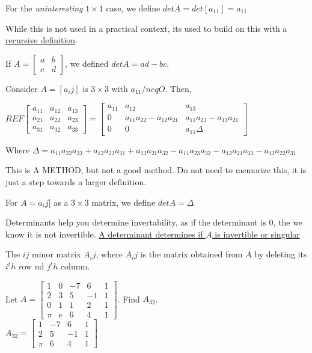 \documentclass{report}
\begin{document}
\begin{definition}
For the \emph{uninteresting} $1\times 1$ case, we define $det A = det [a_11] = a_11$
\end{definition}
\begin{remark}
While this is not used in a practical context, its used to build on this with a \underline{recursive definition}.
\end{remark}
\begin{definition}
If $A=\begin{bmatrix}
a & b \\
c & d
\end{bmatrix}$, we defined $det A = ad - bc$.
\end{definition}

Consider $A=[a_ij]$ is $3\times 3$ with $a_11/neq O$. Then,
\begin{center}
	$REF\begin{bmatrix}
	a_11 & a_12 & a_13 \\
	a_21 & a_22 & a_23 \\
	a_31 & a_32 & a_33
	\end{bmatrix} =
	\begin{bmatrix}
	a_11 & a_12 & a_13 \\
	0 & a_11a_22-a_12a_21 & a_11a_23-a_13a_21 \\
	0 & 0 & a_11\Delta 
	\end{bmatrix}$
\end{center}
Where $\Delta = a_11a_22a_33+a_12a_23a_31+a_13a_21a_32-a_11a_23a_32-a_12a_21a_33-a_13a_22a_31$
\begin{remark}
This is A METHOD, but not a good method. Do not need to memorize this, it is just a step towards a larger definition.
\end{remark}

\begin{definition}
For $A=a_ij]$ as a $3\times 3$ matrix, we define $det A=\Delta$
\end{definition}

Determinants help you determine invertability, as if the determinant is 0, the we know it is not invertible. \underline{A determinant determines if $A$ is invertible or singular}

\begin{definition}
The $ij$ minor matrix $A_ij$, where $A_ij$ is the matrix obtained from $A$ by deleting its $i^th$ row nd $j^th$ column.
\end{definition}

\begin{example}
Let $A=\begin{bmatrix}
1 & 0 & -7 & 6 & 1 \\
2 & 3 & 5 & -1 & 1 \\
0 & 1 & 1 & 2 & 1 \\
\pi & e & 6 & 4 & 1
\end{bmatrix}$. Find $A_{32}$.\\
$A_{32}=\begin{bmatrix}
1 & -7 & 6 & 1 \\
2 & 5 & -1 & 1 \\
\pi & 6 & 4 & 1
\end{bmatrix}$
\end{example}
\end{document}
